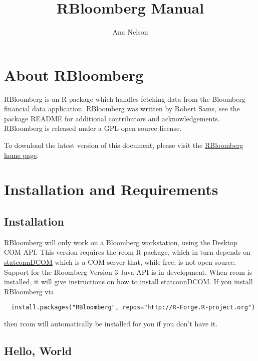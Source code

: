 \documentclass[a4paper]{article}
\title{RBloomberg Manual}
\author{Ana Nelson}
\begin{document}
\maketitle


\section{About RBloomberg} %
\label{sec:about}

RBloomberg is an R package which handles fetching data from the Bloomberg financial data application. RBloomberg was written by Robert Sams, see the package README for additional contributors and acknowledgements. RBloomberg is released under a GPL open source license.

To download the latest version of this document, please visit the \href{http://rbloomberg.r-forge.r-project.org}{RBloomberg home page}.


\section{Installation and Requirements} %
\label{sec:installation_and_requirements}

\subsection{Installation} %
\label{sub:installation}

RBloomberg will only work on a Bloomberg workstation, using the Desktop COM API. This version requires the rcom R package, which in turn depends on \href{http://rcom.univie.ac.at/}{statconnDCOM} which is a COM server that, while free, is not open source. Support for the Bloomberg Version 3 Java API is in development. When rcom is installed, it will give instructions on how to install statconnDCOM. If you install RBloomberg via

\begin{verbatim}
  install.packages("RBloomberg", repos="http://R-Forge.R-project.org")
\end{verbatim}

then rcom will automatically be installed for you if you don't have it.


\subsection{Hello, World} %
\label{sub:hello_world}
\end{document}

